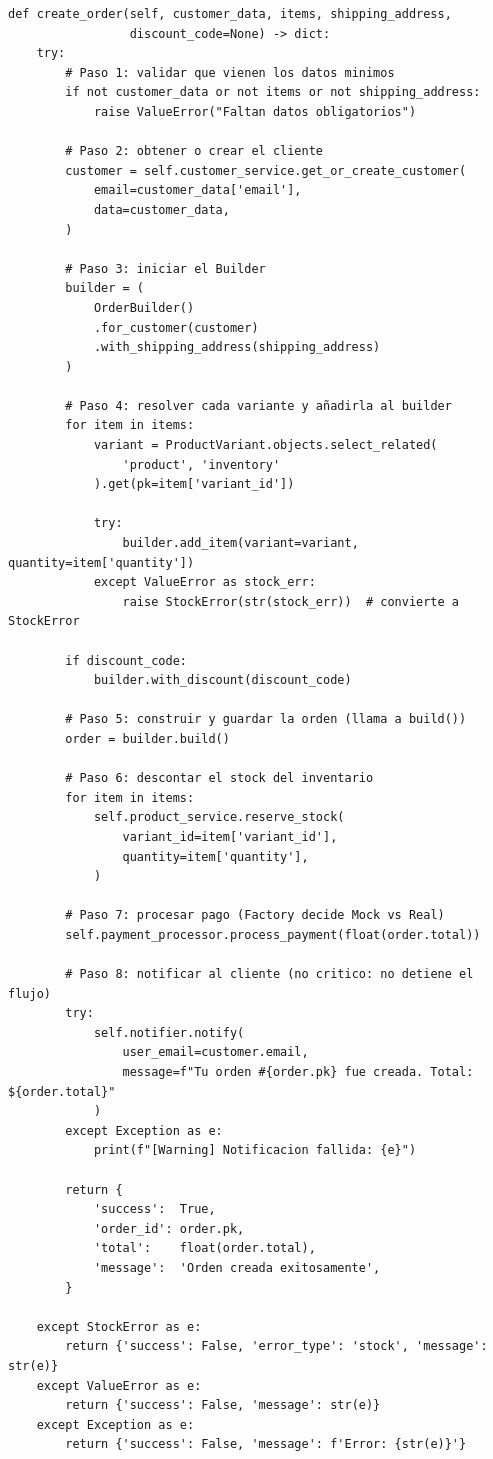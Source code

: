 \documentclass[12pt, a4paper]{article}
\begin{document}
\begin{lstlisting}[caption={orders/services.py -- create\_order (flujo completo)}]
def create_order(self, customer_data, items, shipping_address,
                 discount_code=None) -> dict:
    try:
        # Paso 1: validar que vienen los datos minimos
        if not customer_data or not items or not shipping_address:
            raise ValueError("Faltan datos obligatorios")

        # Paso 2: obtener o crear el cliente
        customer = self.customer_service.get_or_create_customer(
            email=customer_data['email'],
            data=customer_data,
        )

        # Paso 3: iniciar el Builder
        builder = (
            OrderBuilder()
            .for_customer(customer)
            .with_shipping_address(shipping_address)
        )

        # Paso 4: resolver cada variante y añadirla al builder
        for item in items:
            variant = ProductVariant.objects.select_related(
                'product', 'inventory'
            ).get(pk=item['variant_id'])

            try:
                builder.add_item(variant=variant, quantity=item['quantity'])
            except ValueError as stock_err:
                raise StockError(str(stock_err))  # convierte a StockError

        if discount_code:
            builder.with_discount(discount_code)

        # Paso 5: construir y guardar la orden (llama a build())
        order = builder.build()

        # Paso 6: descontar el stock del inventario
        for item in items:
            self.product_service.reserve_stock(
                variant_id=item['variant_id'],
                quantity=item['quantity'],
            )

        # Paso 7: procesar pago (Factory decide Mock vs Real)
        self.payment_processor.process_payment(float(order.total))

        # Paso 8: notificar al cliente (no critico: no detiene el flujo)
        try:
            self.notifier.notify(
                user_email=customer.email,
                message=f"Tu orden #{order.pk} fue creada. Total: ${order.total}"
            )
        except Exception as e:
            print(f"[Warning] Notificacion fallida: {e}")

        return {
            'success':  True,
            'order_id': order.pk,
            'total':    float(order.total),
            'message':  'Orden creada exitosamente',
        }

    except StockError as e:
        return {'success': False, 'error_type': 'stock', 'message': str(e)}
    except ValueError as e:
        return {'success': False, 'message': str(e)}
    except Exception as e:
        return {'success': False, 'message': f'Error: {str(e)}'}
\end{lstlisting}
\end{document}
